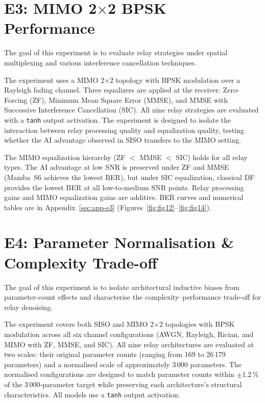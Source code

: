 \section{E3: MIMO 2$\times$2 BPSK Performance}\label{sec:mimo-2x2-bpsk-performance}

The goal of this experiment is to evaluate relay strategies under spatial multiplexing
and various interference cancellation techniques.

The experiment uses a MIMO 2$\times$2 topology with BPSK modulation over a Rayleigh
fading channel. Three equalizers are applied at the receiver: Zero-Forcing (ZF), Minimum
Mean Square Error (MMSE), and MMSE with Successive Interference Cancellation (SIC).
All nine relay strategies are evaluated with a \texttt{tanh} output activation. The
experiment is designed to isolate the interaction between relay processing quality and
equalization quality, testing whether the AI advantage observed in SISO transfers to
the MIMO setting.

The MIMO equalization hierarchy (ZF $<$ MMSE $<$ SIC) holds for all relay types. The
AI advantage at low SNR is preserved under ZF and MMSE (Mamba~S6 achieves the lowest
BER), but under SIC equalization, classical DF provides the lowest BER at all
low-to-medium SNR points. Relay processing gains and MIMO equalization gains are
additive.
BER curves and numerical tables are in Appendix~\ref{sec:app-e3}
(Figures~\ref{fig:fig12}--\ref{fig:fig14}).

\section{E4: Parameter Normalisation \& Complexity Trade-off}\label{sec:parameter-normalization-complexity-trade-off}

The goal of this experiment is to isolate architectural inductive biases from
parameter-count effects and characterise the complexity--performance trade-off for relay
denoising.

The experiment covers both SISO and MIMO 2$\times$2 topologies with BPSK modulation
across all six channel configurations (AWGN, Rayleigh, Rician, and MIMO with ZF, MMSE,
and SIC). All nine relay architectures are evaluated at two scales: their original
parameter counts (ranging from 169 to 26\,179 parameters) and a normalised scale of
approximately 3\,000 parameters. The normalised configurations are designed to match
parameter counts within $\pm$1.2\,\% of the 3\,000-parameter target while preserving
each architecture's structural characteristics. All models use a \texttt{tanh} output
activation.

